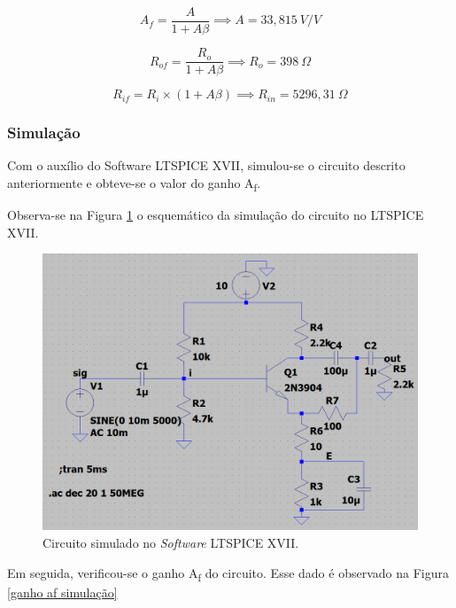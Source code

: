\documentclass[journal, a4paper]{IEEEtran}
\begin{document}
    $$ A_f = \frac{A}{1+A \beta} \implies A = 33,815 \: V/V$$
    
    $$ R_{of} = \frac{R_o}{1+A \beta} \implies R_{o} = 398 \: \Omega $$
    
    $$ R_{if} = R_i \times (1+A \beta) \implies R_{in} = 5296,31 \: \Omega $$
    
    \subsubsection{Simulação}
    
    \tab Com o auxílio do Software LT{\ssmall SPICE} XVII,
    simulou-se o circuito descrito anteriormente e obteve-se o
    valor do ganho A\textsubscript{f}.
    
    \tab Observa-se na Figura \ref{circuito ltspice} o esquemático da simulação do circuito no LT{\ssmall SPICE} XVII.
        \begin{figure}[H]
    		\begin{center}
    		\includegraphics[width=\columnwidth]{circuito-simulacao.PNG}
    		\caption{Circuito simulado no \textit{Software} LT{\ssmall SPICE} XVII.}
    		\label{circuito ltspice}
    		\end{center}
    	\end{figure}
    	
    \tab Em seguida, verificou-se o ganho A\textsubscript{f} do circuito. Esse dado é observado na Figura \ref{ganho af simulação}
    	
\end{document}
